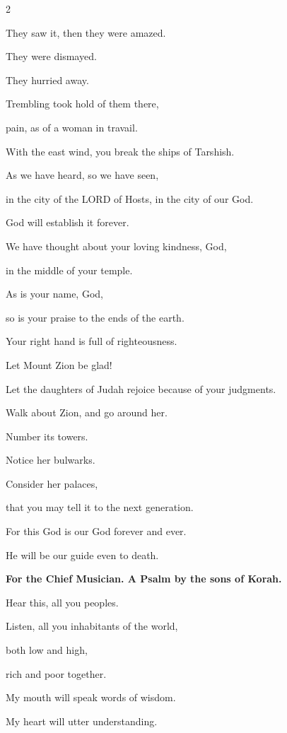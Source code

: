 \begin{multicols}{2}
	
	\myverse{}They saw it, then they were amazed.
	
	They were dismayed.
	
	They hurried away.
	
	
	\myverse{}Trembling took hold of them there,
	
	pain, as of a woman in travail.
	
	
	\myverse{}With the east wind, you break the ships of Tarshish.
	
	
	\myverse{}As we have heard, so we have seen,
	
	in the city of the LORD of Hosts, in the city of our God.
	
	God will establish it forever.
	
	\vspace{\baselineskip}
	
	
	\myverse{}We have thought about your loving kindness, God,
	
	in the middle of your temple.
	
	
	\myverse{}As is your name, God,
	
	so is your praise to the ends of the earth.
	
	Your right hand is full of righteousness.
	
	
	\myverse{}Let Mount Zion be glad!
	
	Let the daughters of Judah rejoice because of your judgments.
	
	
	\myverse{}Walk about Zion, and go around her.
	
	Number its towers.
	
	
	\myverse{}Notice her bulwarks.
	
	Consider her palaces,
	
	that you may tell it to the next generation.
	
	
	\myverse{}For this God is our God forever and ever.
	
	He will be our guide even to death.
	
	
	\mychapter{}\textbf{For the Chief Musician. A Psalm by the sons of Korah.}
	
	\myverse*{}Hear this, all you peoples.
	
	Listen, all you inhabitants of the world,
	
	
	\myverse{}both low and high,
	
	rich and poor together.
	
	
	\myverse{}My mouth will speak words of wisdom.
	
	My heart will utter understanding.
	

\end{multicols}

